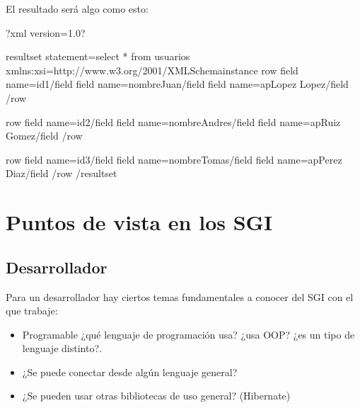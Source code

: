 \documentclass[letterpaper,10pt,spanish]{sphinxmanual}
\begin{document}
El resultado será algo como esto:

\begin{sphinxVerbatim}[commandchars=\\\{\}]
\PYGZlt{}?xml version=\PYGZdq{}1.0\PYGZdq{}?\PYGZgt{}

\PYGZlt{}resultset statement=\PYGZdq{}select * from usuarios
\PYGZdq{} xmlns:xsi=\PYGZdq{}http://www.w3.org/2001/XMLSchema\PYGZhy{}instance\PYGZdq{}
  \PYGZlt{}row\PYGZgt{}
                \PYGZlt{}field name=\PYGZdq{}id\PYGZdq{}\PYGZgt{}1\PYGZlt{}/field\PYGZgt{}
                \PYGZlt{}field name=\PYGZdq{}nombre\PYGZdq{}\PYGZgt{}Juan\PYGZlt{}/field\PYGZgt{}
                \PYGZlt{}field name=\PYGZdq{}ap\PYGZdq{}\PYGZgt{}Lopez Lopez\PYGZlt{}/field\PYGZgt{}
  \PYGZlt{}/row\PYGZgt{}

  \PYGZlt{}row\PYGZgt{}
                \PYGZlt{}field name=\PYGZdq{}id\PYGZdq{}\PYGZgt{}2\PYGZlt{}/field\PYGZgt{}
                \PYGZlt{}field name=\PYGZdq{}nombre\PYGZdq{}\PYGZgt{}Andres\PYGZlt{}/field\PYGZgt{}
                \PYGZlt{}field name=\PYGZdq{}ap\PYGZdq{}\PYGZgt{}Ruiz Gomez\PYGZlt{}/field\PYGZgt{}
  \PYGZlt{}/row\PYGZgt{}

  \PYGZlt{}row\PYGZgt{}
                \PYGZlt{}field name=\PYGZdq{}id\PYGZdq{}\PYGZgt{}3\PYGZlt{}/field\PYGZgt{}
                \PYGZlt{}field name=\PYGZdq{}nombre\PYGZdq{}\PYGZgt{}Tomas\PYGZlt{}/field\PYGZgt{}
                \PYGZlt{}field name=\PYGZdq{}ap\PYGZdq{}\PYGZgt{}Perez Diaz\PYGZlt{}/field\PYGZgt{}
  \PYGZlt{}/row\PYGZgt{}
\PYGZlt{}/resultset\PYGZgt{}
\end{sphinxVerbatim}


\section{Puntos de vista en los SGI}
\label{\detokenize{tema8:puntos-de-vista-en-los-sgi}}

\subsection{Desarrollador}
\label{\detokenize{tema8:desarrollador}}
Para un desarrollador hay ciertos temas fundamentales a conocer del SGI con el que trabaje:
\begin{itemize}
\item {} 
Programable ¿qué lenguaje de programación usa? ¿usa OOP? ¿es un tipo de lenguaje distinto?.

\item {} 
¿Se puede conectar desde algún lenguaje general?

\item {} 
¿Se pueden usar otras bibliotecas de uso general? (Hibernate)

\end{itemize}
\end{document}
